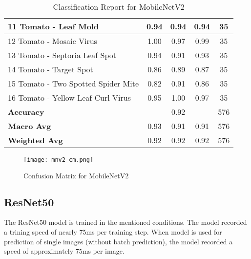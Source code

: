 \begin{table}[h!]
{\begin{tabular}{|l|c|c|c|c|}
    11 Tomato - Leaf Mold                             & 0.94               & 0.94            & 0.94              & 35               \\ \hline
    12 Tomato - Mosaic Virus                          & 1.00               & 0.97            & 0.99              & 35               \\ \hline
    13 Tomato - Septoria Leaf Spot                    & 0.94               & 0.91            & 0.93              & 35               \\ \hline
    14 Tomato - Target Spot                           & 0.86               & 0.89            & 0.87              & 35               \\ \hline
    15 Tomato - Two Spotted Spider Mite               & 0.82               & 0.91            & 0.86              & 35               \\ \hline
    16 Tomato - Yellow Leaf Curl Virus                & 0.95               & 1.00            & 0.97              & 35               \\ \hline
    \textbf{Accuracy}                                 & \multicolumn{3}{c|}{0.92}            & 576              \\ \hline
    \textbf{Macro Avg}                                & 0.93               & 0.91            & 0.91              & 576              \\ \hline
    \textbf{Weighted Avg}                             & 0.92               & 0.92            & 0.92              & 576              \\ \hline
    \end{tabular}%
    }
    \caption{Classification Report for MobileNetV2}
    \label{tab:classification_report_mnv2}
\end{table}

\begin{figure}[h!]
    \centering
    \texttt{[image: mnv2\_cm.png]}
    \caption{Confusion Matrix for MobileNetV2}
    \label{fig:mnv2_cm}
\end{figure}

\subsection{ResNet50}

The ResNet50 model is trained in the mentioned conditions. The model recorded a trining speed of nearly 75ms per training step. When model is used for prediction of single images (without batch prediction), the model recorded a speed of approximately 75ms per image. 

